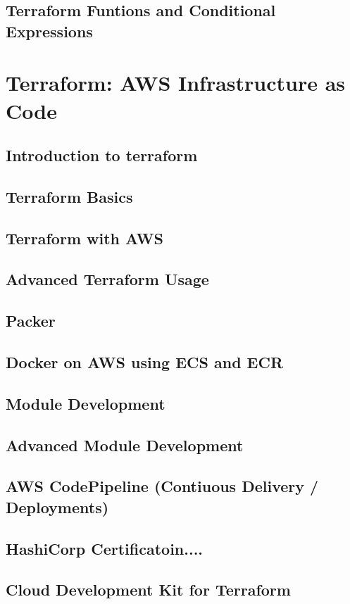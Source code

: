 \documentclass[a4paper, 11pt]{book}
\begin{document}
    \subsection{Terraform Funtions and Conditional Expressions}

    \section{Terraform: AWS Infrastructure as Code}
    \subsection{Introduction to terraform}
    \subsection{Terraform Basics}
    \subsection{Terraform with AWS}
    \subsection{Advanced Terraform Usage}
    \subsection{Packer}
    \subsection{Docker on AWS using ECS and ECR}
    \subsection{Module Development}
    \subsection{Advanced Module Development}
    \subsection{AWS CodePipeline (Contiuous Delivery / Deployments)}
    \subsection{HashiCorp Certificatoin....}
    \subsection{Cloud Development Kit for Terraform}
\end{document}
